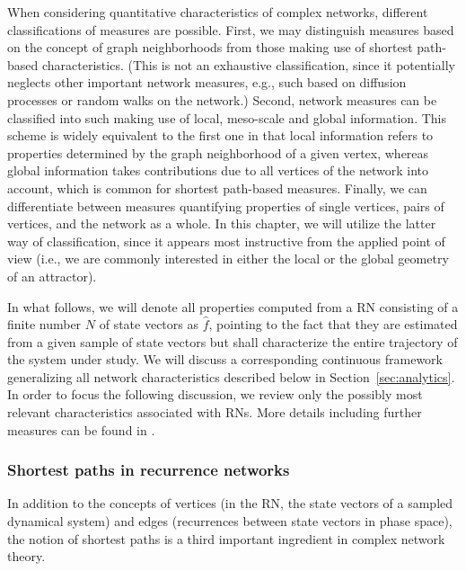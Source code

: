\documentclass[graybox]{svmult}
\begin{document}
When considering quantitative characteristics of complex networks, different classifications of measures are possible. First, we may distinguish measures based on the concept of graph neighborhoods from those making use of shortest path-based characteristics. (This is not an exhaustive classification, since it potentially neglects other important network measures, e.g., such based on diffusion processes or random walks on the network.) Second, network measures can be classified into such making use of local, meso-scale and global information. This scheme is widely equivalent to the first one in that local information refers to properties determined by the graph neighborhood of a given vertex, whereas global information takes contributions due to all vertices of the network into account, which is common for shortest path-based measures. Finally, we can differentiate between measures quantifying properties of single vertices, pairs of vertices, and the network as a whole. In this chapter, we will utilize the latter way of classification, since it appears most instructive from the applied point of view (i.e., we are commonly interested in either the local or the global geometry of an attractor).

In what follows, we will denote all properties computed from a RN consisting of a finite number $N$ of state vectors as $\hat{f}$, pointing to the fact that they are estimated from a given sample of state vectors but shall characterize the entire trajectory of the system under study. We will discuss a corresponding continuous framework generalizing all network characteristics described below in Section~\ref{sec:analytics}. In order to focus the following discussion, we review only the possibly most relevant characteristics associated with RNs. More details including further measures can be found in \cite{Donges2012PRE,Donner2010NJP}.


\subsubsection{Shortest paths in recurrence networks}

In addition to the concepts of vertices (in the RN, the state vectors of a sampled dynamical system) and edges (recurrences between state vectors in phase space), the notion of shortest paths is a third important ingredient in complex network theory. 
\end{document}
